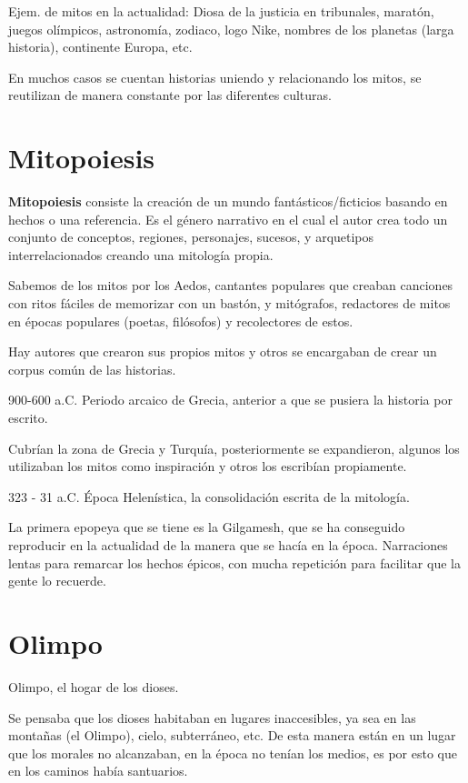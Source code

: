 Ejem. de mitos en la actualidad: Diosa de la justicia en tribunales, maratón, juegos olímpicos, astronomía, zodiaco, logo Nike, nombres de los planetas (larga historia), continente Europa, etc.

En muchos casos se cuentan historias uniendo y relacionando los mitos, se reutilizan de manera constante por las diferentes culturas.

\section{Mitopoiesis}
\textbf{Mitopoiesis} consiste la creación de un mundo fantásticos/ficticios basando en hechos o una referencia. Es el género narrativo en el cual el autor crea todo un conjunto de conceptos, regiones, personajes, sucesos, y arquetipos interrelacionados creando una mitología propia.

Sabemos de los mitos por los Aedos, cantantes populares que creaban canciones con ritos fáciles de memorizar con un bastón, y mitógrafos, redactores de mitos en épocas populares (poetas, filósofos) y recolectores de estos.

Hay autores que crearon sus propios mitos y otros se encargaban de crear un corpus común de las historias.

900-600 a.C. Periodo arcaico de Grecia, anterior a que se pusiera la historia por escrito.

Cubrían la zona de Grecia y Turquía, posteriormente se expandieron, algunos los utilizaban los mitos como inspiración y otros los escribían propiamente.

323 - 31 a.C. Época Helenística, la consolidación escrita de la mitología.

La primera epopeya que se tiene es la Gilgamesh, que se ha conseguido reproducir en la actualidad de la manera que se hacía en la época. Narraciones lentas para remarcar los hechos épicos, con mucha repetición para facilitar que la gente lo recuerde.

\section{Olimpo}
Olimpo, el hogar de los dioses.

Se pensaba que los dioses habitaban en lugares inaccesibles, ya sea en las montañas (el Olimpo), cielo, subterráneo, etc. De esta manera están en un lugar que los morales no alcanzaban, en la época no tenían los medios, es por esto que en los caminos había santuarios.

